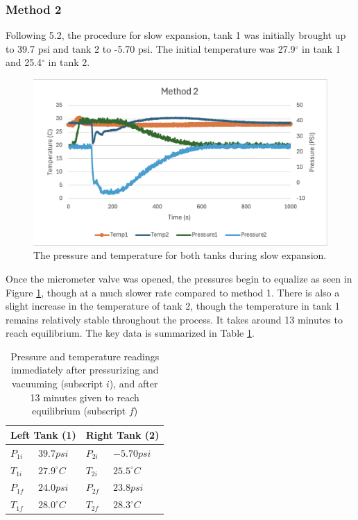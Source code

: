 \documentclass[titlepage, twocolumn, 12pt]{article}
\begin{document}
\subsubsection{Method 2}
Following 5.2, the procedure for slow expansion, tank 1 was initially brought up to 39.7 psi and tank 2 to -5.70 psi. The initial temperature was 27.9\(^{\circ}\) in tank 1 and 25.4\(^{\circ}\) in tank 2. 
\begin{figure}[h]
    \centering
    \includegraphics[scale=0.4]{images/Method_2.png}
    \caption{The pressure and temperature for both tanks during slow expansion.}
    \label{fig:method2}
\end{figure}

\setlength{\belowcaptionskip}{0cm}
Once the micrometer valve was opened, the pressures begin to equalize as seen in Figure \ref{fig:method2}, though at a much slower rate compared to method 1. There is also a slight increase in the temperature of tank 2, though the temperature in tank 1 remains relatively stable throughout the process. It takes around 13 minutes to reach equilibrium. The key data is summarized in Table \ref{table-method2}.

\setlength{\tabcolsep}{0.5em} %
\begin{table}[]
\centering
\begin{tabular}{|ll|ll|}
\hline
\multicolumn{2}{|l|}{Left Tank (1)}     & \multicolumn{2}{l|}{Right Tank (2)}    \\ \hline
\multicolumn{1}{|l|}{$P_{1i}$} & $39.7psi$ & \multicolumn{1}{l|}{$P_{2i}$} & $-5.70psi$ \\ \hline
\multicolumn{1}{|l|}{$T_{1i}$} & $27.9^{\circ}C$    & \multicolumn{1}{l|}{$T_{2i}$} & $25.5^{\circ}C$    \\ \hline
\multicolumn{1}{|l|}{$P_{1f}$} & $24.0psi$ & \multicolumn{1}{l|}{$P_{2f}$} & $23.8psi$ \\ \hline
\multicolumn{1}{|l|}{$T_{1f}$} & $28.0^{\circ}C$    & \multicolumn{1}{l|}{$T_{2f}$} & $28.3^{\circ}C$      \\ \hline
\end{tabular}
\caption{Pressure and temperature readings immediately after pressurizing and vacuuming (subscript $i$), and after 13 minutes given to reach equilibrium (subscript $f$)}
\label{table-method2}
\end{table}
\end{document}
